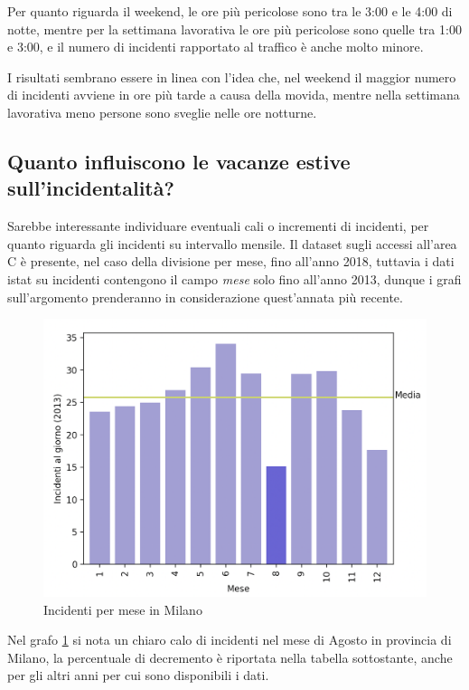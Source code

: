 \documentclass[a4paper]{report}
\begin{document}
Per quanto riguarda il weekend, le ore più pericolose sono tra le 3:00 e le 4:00 di notte, mentre per 
la settimana lavorativa le ore più pericolose sono quelle tra 1:00 e 3:00, e il numero di 
incidenti rapportato al traffico è anche molto minore. 

I risultati sembrano essere in linea con l'idea che, nel weekend il maggior 
numero di incidenti avviene in ore più tarde a causa della movida, mentre nella settimana lavorativa 
meno persone sono sveglie nelle ore notturne.

\subsection{Quanto influiscono le vacanze estive sull'incidentalità?}

Sarebbe interessante individuare eventuali cali o incrementi di incidenti, per quanto riguarda gli 
incidenti su intervallo mensile.
Il dataset sugli accessi all'area C è presente, nel caso della divisione per mese, fino all'anno 2018, 
tuttavia i dati istat su incidenti contengono il campo \textit{mese} solo fino all'anno 2013,
dunque i grafi sull'argomento prenderanno in considerazione quest'annata più recente.

\begin{figure}
    \includegraphics[width=\linewidth]{../src/incidenti/incidenti_senza_coords/mese_incidenti/milano_mese.png}
    \caption{Incidenti per mese in Milano}
    \label{fig:milano-mese}
\end{figure}

Nel grafo \ref{fig:milano-mese} si nota un chiaro calo di incidenti nel mese di 
Agosto in provincia di Milano, la percentuale di decremento è riportata nella tabella sottostante, 
anche per gli altri anni per cui sono disponibili i dati.
\end{document}
